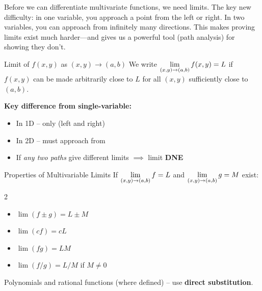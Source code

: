\documentclass[11pt]{article}
\begin{document}

\begin{background}
Before we can differentiate multivariate functions, we need limits. The key new difficulty: in one variable, you approach a point from the left or right. In two variables, you can approach from infinitely many directions. This makes proving limits exist much harder---and gives us a powerful tool (path analysis) for showing they don't.
\end{background}


\begin{defbox}{Limit of $f(x,y)$ as $(x,y)\to(a,b)$}
We write $\displaystyle\lim_{(x,y)\to(a,b)} f(x,y) = L$ if $f(x,y)$ can be made arbitrarily close to $L$ for all $(x,y)$ sufficiently close to $(a,b)$.

\medskip
\textbf{Key difference from single-variable:}
\begin{itemize}[nosep]
  \item In 1D -- only  (left and right)
  \item In 2D -- must approach from 
  \item If \textit{any two paths} give different limits $\implies$ limit \textbf{DNE}
\end{itemize}
\end{defbox}

\begin{formulabox}{Properties of Multivariable Limits}
If $\displaystyle\lim_{(x,y)\to(a,b)} f = L$ and $\displaystyle\lim_{(x,y)\to(a,b)} g = M$ exist:
\begin{multicols}{2}
\begin{itemize}[nosep, leftmargin=*]
  \item $\lim(f \pm g) = L \pm M$
  \item $\lim(cf) = cL$
  \item $\lim(fg) = LM$
  \item $\lim(f/g) = L/M$ if $M \neq 0$
\end{itemize}
\end{multicols}
Polynomials and rational functions (where defined) -- use \textbf{direct substitution}.
\end{formulabox}

\end{document}
